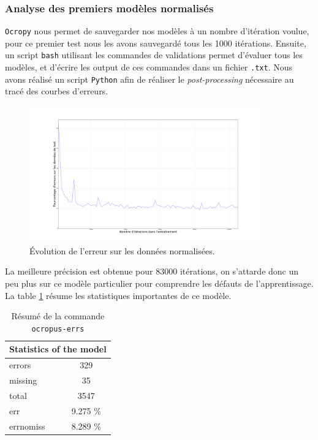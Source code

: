 \documentclass{article}
\begin{document}
\subsubsection{Analyse des premiers modèles normalisés}

\texttt{Ocropy} nous permet de sauvegarder nos modèles à un nombre d'itération voulue, pour ce premier test nous les avons sauvegardé tous les 1000 itérations. Ensuite, un script \texttt{bash} utilisant les commandes de validations permet d'évaluer tous les modèles, et d'écrire les output de ces commandes dans un fichier \texttt{.txt}. Nous avons réalisé un script \texttt{Python} afin de réaliser le \textit{post-processing} nécessaire au tracé des courbes d'erreurs.

\begin{figure}[!h] 
    \center
    \includegraphics[width=10cm]{error_normalized.png}
    \caption{Évolution de l'erreur sur les données normalisées.}
    \label{err_norm}
\end{figure}

La meilleure précision est obtenue pour 83000 itérations, on s'attarde donc un peu plus sur ce modèle particulier pour comprendre les défauts de l'apprentissage. La table \ref{t1} résume les statistiques importantes de ce modèle. \\

\begin{table}[!h]
    \centering
    \begin{tabular}{|l|l|lc|l|l|}
        \hline
        \multicolumn{6}{|c|}{\cellcolor[gray]{0.8}Statistics of the model}                   \\ \hline
        \multicolumn{3}{|l|}{errors}    & \multicolumn{3}{c|}{329}      \\ \hline
        \multicolumn{3}{|l|}{missing}   & \multicolumn{3}{c|}{35}       \\ \hline
        \multicolumn{3}{|l|}{total}     & \multicolumn{3}{c|}{3547}     \\ \hline
        \multicolumn{3}{|l|}{err}       & \multicolumn{3}{c|}{9.275 \%} \\ \hline
        \multicolumn{3}{|l|}{errnomiss} & \multicolumn{3}{c|}{8.289 \%} \\ \hline
    \end{tabular}
    \caption{Résumé de la commande \texttt{ocropus-errs}}
    \label{t1}
\end{table}
\end{document}
